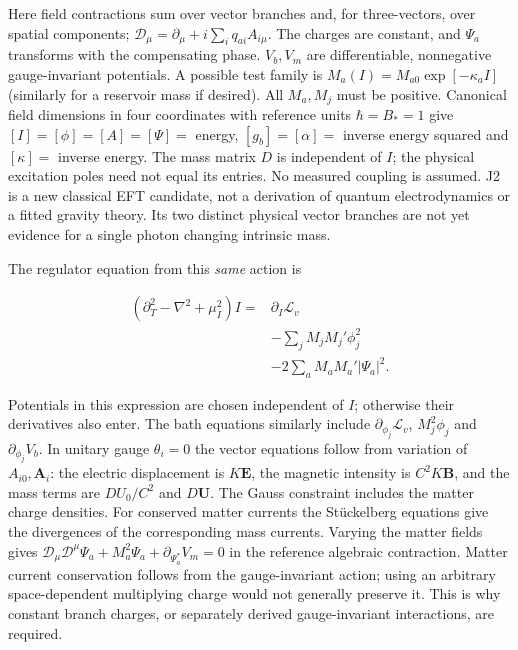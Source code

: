 \documentclass[
  11pt,
  twoside]{article}
\begin{document}
Here field contractions sum over vector branches and, for three-vectors,
over spatial components;
\(\mathcal D_\mu=\partial_\mu+i\sum_i q_{ai}A_{i\mu}\). The charges are
constant, and \(\Psi_a\) transforms with the compensating phase.
\(V_b,V_m\) are differentiable, nonnegative gauge-invariant potentials.
A possible test family is \(M_a(I)=M_{a0}\exp[-\kappa_a I]\) (similarly
for a reservoir mass if desired). All \(M_a,M_j\) must be positive.
Canonical field dimensions in four coordinates with reference units
\(\hbar=B_*=1\) give \([I]=[\phi]=[A]=[\Psi]=\) energy,
\([g_b]=[\alpha]=\) inverse energy squared and \([\kappa]=\) inverse
energy. The mass matrix \(D\) is independent of \(I\); the physical
excitation poles need not equal its entries. No measured coupling is
assumed. J2 is a new classical EFT candidate, not a derivation of
quantum electrodynamics or a fitted gravity theory. Its two distinct
physical vector branches are not yet evidence for a single photon
changing intrinsic mass.

The regulator equation from this \emph{same} action is

\[\begin{aligned}
(\partial_T^2-\nabla^2+\mu_I^2)I={}&\partial_I\mathcal L_v\\
&-\sum_j M_j M_j'\phi_j^2\\
&-2\sum_a M_a M_a'|\Psi_a|^2 .
\end{aligned}\tag{J3}\]

Potentials in this expression are chosen independent of \(I\); otherwise
their derivatives also enter. The bath equations similarly include
\(\partial_{\phi_j}\mathcal L_v\), \(M_j^2\phi_j\) and
\(\partial_{\phi_j}V_b\). In unitary gauge \(\theta_i=0\) the vector
equations follow from variation of \(A_{i0},\mathbf A_i\): the electric
displacement is \(K\mathbf E\), the magnetic intensity is
\(C^2K\mathbf B\), and the mass terms are \(D U_0/C^2\) and
\(D\mathbf U\). The Gauss constraint includes the matter charge
densities. For conserved matter currents the Stückelberg equations give
the divergences of the corresponding mass currents. Varying the matter
fields gives
\(\mathcal D_\mu\mathcal D^\mu\Psi_a+M_a^2\Psi_a+\partial_{\Psi_a^*}V_m=0\)
in the reference algebraic contraction. Matter current conservation
follows from the gauge-invariant action; using an arbitrary
space-dependent multiplying charge would not generally preserve it. This
is why constant branch charges, or separately derived gauge-invariant
interactions, are required.
\end{document}
